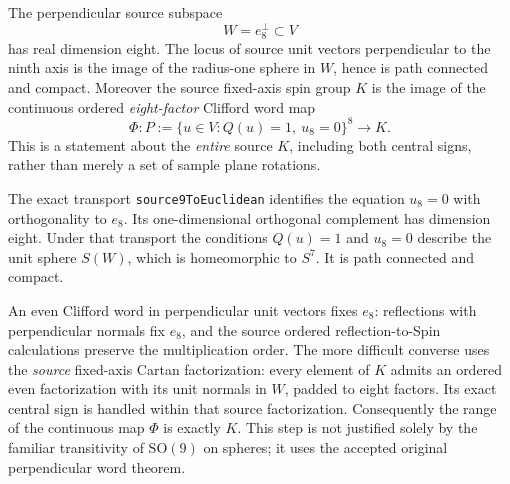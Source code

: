 \begin{sourceaccount}
The perpendicular source subspace
\[
 W=e_8^\perp\subset V
\]
has real dimension eight. The locus of source unit vectors perpendicular
to the ninth axis is the image of the radius-one sphere in $W$, hence
is path connected and compact. Moreover the source fixed-axis spin group
$K$ is the image of the continuous ordered \emph{eight-factor} Clifford
word map
\begin{equation}\label{eq:source-eight-word}
 \Phi:P:=\bigl\{u\in V:Q(u)=1,\ u_8=0\bigr\}^{8}
 \longrightarrow K.
\end{equation}
This is a statement about the \emph{entire} source $K$, including both
central signs, rather than merely a set of sample plane rotations.
\end{sourceaccount}
\begin{sourceexplanation}
The exact transport \texttt{source9ToEuclidean} identifies the equation
$u_8=0$ with orthogonality to $e_8$. Its one-dimensional orthogonal
complement has dimension eight. Under that transport the conditions
$Q(u)=1$ and $u_8=0$ describe the unit sphere $S(W)$, which is
homeomorphic to $S^7$. It is path connected and compact.

An even Clifford word in perpendicular unit vectors fixes $e_8$:
reflections with perpendicular normals fix $e_8$, and the source
ordered reflection-to-Spin calculations preserve the multiplication
order. The more difficult converse uses the \emph{source} fixed-axis
Cartan factorization: every element of $K$ admits an ordered even
factorization with its unit normals in $W$, padded to eight factors.
Its exact central sign is handled within that source factorization.
Consequently the range of the continuous map $\Phi$ is exactly $K$.
This step is not justified solely by the familiar transitivity of
$\mathrm{SO}(9)$ on spheres; it uses the accepted original perpendicular
word theorem.
\end{sourceexplanation}

